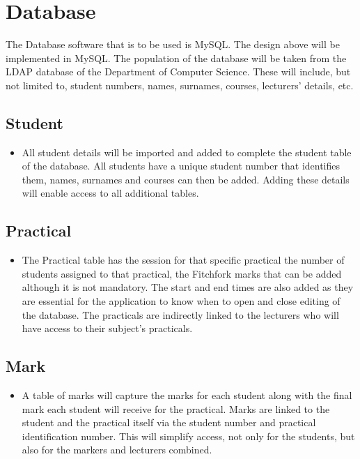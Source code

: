 \documentclass[11pt,a4paper]{article}
\begin{document}
\section{Database}

The Database software that is to be used is MySQL. The design above will be implemented in MySQL. The population of the database will be taken from the LDAP database of the Department of Computer Science. These will include, but not limited to, student numbers, names, surnames, courses, lecturers’ details, etc. 

\subsection{Student}
\begin{itemize}
\item All student details will be imported and added to complete the student table of the database. All students have a unique student number that identifies them, names, surnames and courses can then be added. Adding these details will enable access to all additional tables.
\end{itemize}

\subsection{Practical}
\begin{itemize}
\item The Practical table has the session for that specific practical the number of students assigned to that practical, the Fitchfork marks that can be added although it is not mandatory. The start and end times are also added as they are essential for the application to know when to open and close editing of the database. The practicals are indirectly linked to the lecturers who will have access to their subject’s practicals.
\end{itemize}

\subsection{Mark}
\begin{itemize}
\item A table of marks will capture the marks for each student along with the final mark each student will receive for the practical. Marks are linked to the student and the practical itself via the student number and practical identification number. This will simplify access, not only for the students, but also for the markers and lecturers combined. 
\end{itemize}
\end{document}
